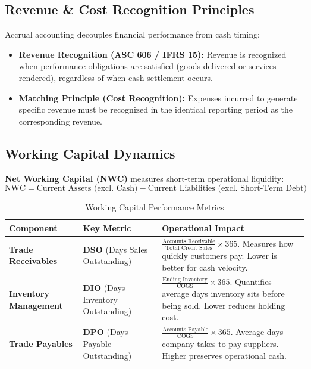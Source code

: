 \documentclass[11pt,a4paper]{article}
\begin{document}
\subsection{Revenue \& Cost Recognition Principles}

Accrual accounting decouples financial performance from cash timing:
\begin{itemize}
  \item \textbf{Revenue Recognition (ASC 606 / IFRS 15):} Revenue is recognized when performance obligations are satisfied (goods delivered or services rendered), regardless of when cash settlement occurs.
  \item \textbf{Matching Principle (Cost Recognition):} Expenses incurred to generate specific revenue must be recognized in the identical reporting period as the corresponding revenue.
\end{itemize}

\subsection{Working Capital Dynamics}

\textbf{Net Working Capital (NWC)} measures short-term operational liquidity:
\begin{equation}
\text{NWC} = \text{Current Assets (excl.\ Cash)} - \text{Current Liabilities (excl.\ Short-Term Debt)}
\end{equation}

\begin{table}[htbp]
\centering
\small
\begin{tabular}{L{3.5cm} L{3.5cm} L{7.5cm}}
\toprule
\textbf{Component} & \textbf{Key Metric} & \textbf{Operational Impact} \\
\midrule
\textbf{Trade Receivables} & \textbf{DSO} (Days Sales Outstanding) & $\frac{\text{Accounts Receivable}}{\text{Total Credit Sales}} \times 365$. Measures how quickly customers pay. Lower is better for cash velocity. \\
\textbf{Inventory Management} & \textbf{DIO} (Days Inventory Outstanding) & $\frac{\text{Ending Inventory}}{\text{COGS}} \times 365$. Quantifies average days inventory sits before being sold. Lower reduces holding cost. \\
\textbf{Trade Payables} & \textbf{DPO} (Days Payable Outstanding) & $\frac{\text{Accounts Payable}}{\text{COGS}} \times 365$. Average days company takes to pay suppliers. Higher preserves operational cash. \\
\bottomrule
\end{tabular}
\caption{Working Capital Performance Metrics}
\label{tab:wc-metrics}
\end{table}
\end{document}
